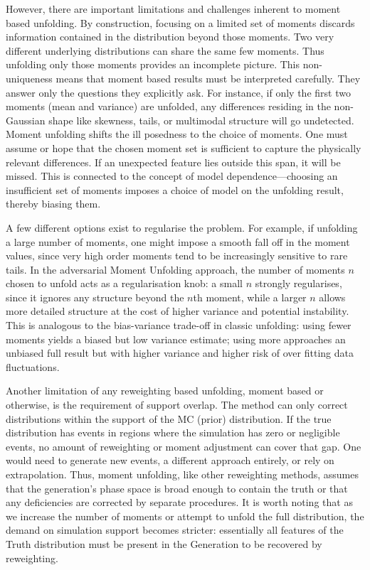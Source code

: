 {{        However, there are important limitations and challenges inherent to moment based unfolding.
        By construction, focusing on a limited set of moments discards information contained in the distribution beyond those moments.
        Two very different underlying distributions can share the same few moments.
        Thus unfolding only those moments provides an incomplete picture.
        This non-uniqueness means that moment based results must be interpreted carefully.
        They answer only the questions they explicitly ask.
        For instance, if only the first two moments (mean and variance) are unfolded, any differences residing in the non-Gaussian shape like skewness, tails, or multimodal structure will go undetected.
        Moment unfolding shifts the ill posedness to the choice of moments.
        One must assume or hope that the chosen moment set is sufficient to capture the physically relevant differences.
        If an unexpected feature lies outside this span, it will be missed.
        This is connected to the concept of model dependence---choosing an insufficient set of moments imposes a choice of model on the unfolding result, thereby biasing them.

        A few different options exist to regularise the problem.
        For example, if unfolding a large number of moments, one might impose a smooth fall off in the moment values, since very high order moments tend to be increasingly sensitive to rare tails.
        In the adversarial Moment Unfolding approach, the number of moments $n$ chosen to unfold acts as a regularisation knob: a small $n$ strongly regularises, since it ignores any structure beyond the $n$th moment, while a larger $n$ allows more detailed structure at the cost of higher variance and potential instability.
        This is analogous to the bias-variance trade-off in classic unfolding: using fewer moments yields a biased but low variance estimate; using more approaches an unbiased full result but with higher variance and higher risk of over fitting data fluctuations.
        
        Another limitation of any reweighting based unfolding, moment based or otherwise, is the requirement of support overlap.
        The method can only correct distributions within the support of the MC (prior) distribution.
        If the true distribution has events in regions where the simulation has zero or negligible events, no amount of reweighting or moment adjustment can cover that gap.
        One would need to generate new events, a different approach entirely, or rely on extrapolation.
        Thus, moment unfolding, like other reweighting methods, assumes that the generation's phase space is broad enough to contain the truth or that any deficiencies are corrected by separate procedures.
        It is worth noting that as we increase the number of moments or attempt to unfold the full distribution, the demand on simulation support becomes stricter: essentially all features of the Truth distribution must be present in the Generation to be recovered by reweighting.
}}
